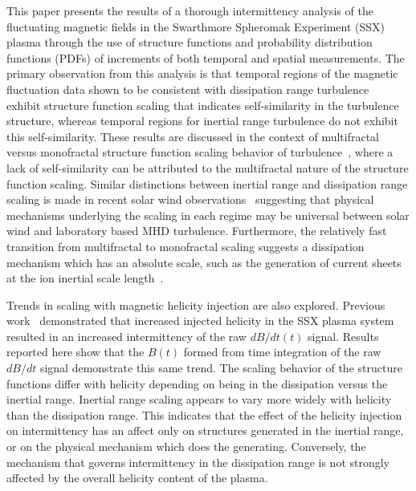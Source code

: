 \documentclass[aps,prl,amsmath,amssymb,reprint,superscriptaddress]{revtex4-1} %
\begin{document}
This paper presents the results of a thorough intermittency analysis of the fluctuating magnetic fields in the Swarthmore Spheromak Experiment (SSX) plasma through the use of structure functions and probability distribution functions (PDFs) of increments of both temporal and spatial measurements. The primary observation from this analysis is that temporal regions of the magnetic fluctuation data shown to be consistent with dissipation range turbulence~\cite{schaffner2014c} exhibit structure function scaling that indicates self-similarity in the turbulence structure, whereas temporal regions for inertial range turbulence do not exhibit this self-similarity. These results are discussed in the context of multifractal versus monofractal structure function scaling behavior of turbulence~\cite{paladin1987,frisch1995,marsch1997}, where a lack of self-similarity can be attributed to the multifractal nature of the structure function scaling. Similar distinctions between inertial range and dissipation range scaling is made in recent solar wind observations~\cite{kiyani2013} suggesting that physical mechanisms underlying the scaling in each regime may be universal between solar wind and laboratory based MHD turbulence. Furthermore, the relatively fast transition from multifractal to monofractal scaling suggests a dissipation mechanism which has an absolute scale, such as the generation of current sheets at the ion inertial scale length~\cite{kiyani2009,kiyani2010}.

Trends in scaling with magnetic helicity injection are also explored. Previous work~\cite{schaffner2014b} demonstrated that increased injected helicity in the SSX plasma system resulted in an increased intermittency of the raw $dB/dt(t)$ signal. Results reported here show that the $B(t)$ formed from time integration of the raw $dB/dt$ signal demonstrate this same trend. The scaling behavior of the structure functions differ with helicity depending on being in the dissipation versus the inertial range. Inertial range scaling appears to vary more widely with helicity than the dissipation range. This indicates that the effect of the helicity injection on intermittency has an affect only on structures generated in the inertial range, or on the physical mechanism which does the generating. Conversely, the mechanism that governs intermittency in the dissipation range is not strongly affected by the overall helicity content of the plasma.
\end{document}
